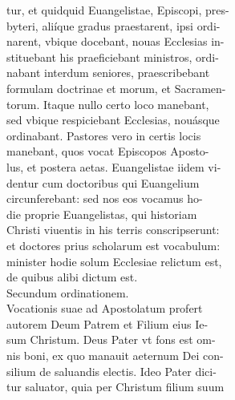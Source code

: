 \documentclass{article}
\begin{document}
\begin{pages}
                tur, et quidquid Euangelistae, Episcopi, pres- \\
                byteri, aliíque gradus praestarent, ipsi ordi- \\
                narent, vbique docebant, nouas Ecclesias in- \\
                stituebant his praeficiebant ministros, ordi- \\
                nabant interdum seniores, praescribebant \\
                formulam doctrinae et morum, et Sacramen- \\
                torum. Itaque nullo certo loco manebant, \\
                sed vbique respiciebant Ecclesias, nouásque \\
                ordinabant. Pastores vero in certis locis \\
                manebant, quos vocat Episcopos Aposto- \\
                lus, et postera aetas. Euangelistae iidem vi- \\
                dentur cum doctoribus qui Euangelium \\
                circunferebant: sed nos eos vocamus ho- \\
                die proprie Euangelistas, qui historiam \\
                Christi viuentis in his terris conscripserunt: \\
                et doctores prius scholarum est vocabulum: \\
                minister hodie solum Ecclesiae relictum est, \\
                de quibus alibi dictum est. \\
                Secundum ordinationem. \\
                Vocationis suae ad Apostolatum profert \\
                autorem Deum Patrem et Filium eius Ie- \\
                sum Christum. Deus Pater vt fons est om- \\
                nis boni, ex quo manauit aeternum Dei con- \\
                silium de saluandis electis. Ideo Pater dici- \\
                tur saluator, quia per Christum filium suum \\

\end{pages}
\end{document}
